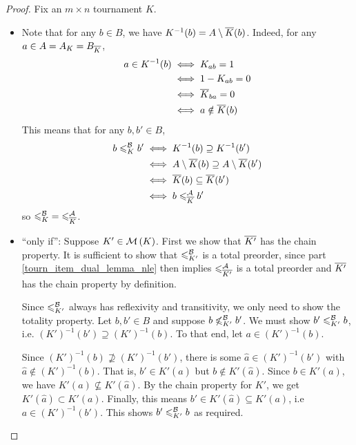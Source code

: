 \begin{proof}
    Fix an $m \times n$ tournament $K$.

    \begin{itemize}
    \item
    Note that for any $b \in B$, we have $K^{-1}(b) = A \setminus {\overline{K}}(b)$.
    Indeed, for any $a \in A = A_K = B_{{\overline{K}}}$,
    \begin{align*}
        a \in K^{-1}(b)
        &\iff K_{ab} = 1 \\
        &\iff 1 - K_{ab} = 0 \\
        &\iff {\overline{K}}_{ba} = 0 \\
        &\iff a \notin {\overline{K}}(b)
    \end{align*}
    This means that for any $b, b' \in B$,
    \begin{align*}
        b \leqslant^{\mathcal{B}}_K b'
        &\iff K^{-1}(b) \supseteq K^{-1}(b') \\
        &\iff A \setminus {\overline{K}}(b) \supseteq A \setminus {\overline{K}}(b') \\
        &\iff {\overline{K}}(b) \subseteq {\overline{K}}(b') \\
        &\iff b \leqslant^{\mathcal{A}}_{{\overline{K}}} b'
    \end{align*}
    so ${\leqslant^{\mathcal{B}}_K} = {\leqslant^{\mathcal{A}}_{{\overline{K}}}}$.

    \item
    ``only if'': Suppose $K' \in \operatorname{\mathcal{M}}\left({K}\right)$. First we show that ${\overline{K'}}$ has
    the chain property. It is sufficient to show that ${\leqslant^{\mathcal{B}}_{K'}}$ is a total
    preorder,\footnotemark{} since part \cref{tourn_item_dual_lemma_nle}
    then implies ${\leqslant^{\mathcal{A}}_{{\overline{K'}}}}$ is a total preorder and ${\overline{K'}}$ has
    the chain property by definition.


    Since ${\leqslant^{\mathcal{B}}_{K'}}$ always has reflexivity and transitivity, we only need
    to show the totality property. Let $b, b' \in B$ and suppose $b
    \not\leqslant^{\mathcal{B}}_{K'} b'$. We must show $b' \leqslant^{\mathcal{B}}_{K'} b$, i.e. $(K')^{-1}(b')
    \supseteq (K')^{-1}(b)$. To that end, let $a \in (K')^{-1}(b)$.

    Since $(K')^{-1}(b) \not\supseteq (K')^{-1}(b')$, there is some $\hat{a}
    \in (K')^{-1}(b')$ with $\hat{a} \notin (K')^{-1}(b)$. That is, $b' \in
    K'(\hat{a})$ but $b \notin K'(\hat{a})$. Since $b \in K'(a)$, we have
    $K'(a) \not\subseteq K'(\hat{a})$. By the chain property for $K'$, we get
    $K'(\hat{a}) \subset K'(a)$. Finally, this means $b' \in K'(\hat{a})
    \subseteq K'(a)$, i.e $a \in (K')^{-1}(b')$. This shows $b' \leqslant^{\mathcal{B}}_{K'} b$
    as required.


\end{itemize}
\end{proof}
